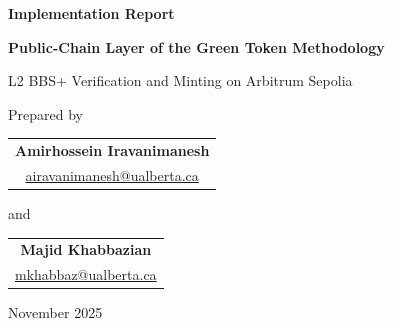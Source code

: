 \documentclass[11pt]{article}
\begin{document}

\begin{titlepage}
  \centering
  \vspace*{2.0cm}

  {\Large\bfseries\color{gtblue}Implementation Report\par}
  \vspace{0.35cm}
  {\LARGE\bfseries Public-Chain Layer of the Green Token Methodology\par}
  \vspace{0.25cm}
  {\large L2 BBS+ Verification and Minting on Arbitrum Sepolia\par}

  \vspace{1.5cm}
  {\large Prepared by\par}
  \vspace{0.4cm}
  \begin{tabular}{c}
    \textbf{Amirhossein Iravanimanesh}\\
    \href{mailto:airavanimanesh@ualberta.ca}{airavanimanesh@ualberta.ca}
  \end{tabular}

  \vspace{0.5cm}
  {\large and\par}
  \vspace{0.5cm}
  \begin{tabular}{c}
    \textbf{Majid Khabbazian}\\
    \href{mailto:mkhabbaz@ualberta.ca}{mkhabbaz@ualberta.ca}
  \end{tabular}

  \vfill
  {\large November 2025\par}
\end{titlepage}
\clearpage
{}
\end{document}
